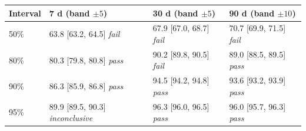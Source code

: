 \begin{tabular}{l lll}
\toprule
Interval & 7 d (band $\pm5$) & 30 d (band $\pm5$) & 90 d (band $\pm10$)\\
\midrule
50\% & 63.8 [63.2, 64.5] \textit{fail} & 67.9 [67.0, 68.7] \textit{fail} & 70.7 [69.9, 71.5] \textit{fail} \\
80\% & 80.3 [79.8, 80.8] \textit{pass} & 90.2 [89.8, 90.5] \textit{fail} & 89.0 [88.5, 89.5] \textit{pass} \\
90\% & 86.3 [85.9, 86.8] \textit{pass} & 94.5 [94.2, 94.8] \textit{pass} & 93.6 [93.2, 93.9] \textit{pass} \\
95\% & 89.9 [89.5, 90.3] \textit{inconclusive} & 96.3 [96.0, 96.5] \textit{pass} & 96.0 [95.7, 96.3] \textit{pass} \\
\bottomrule
\end{tabular}

